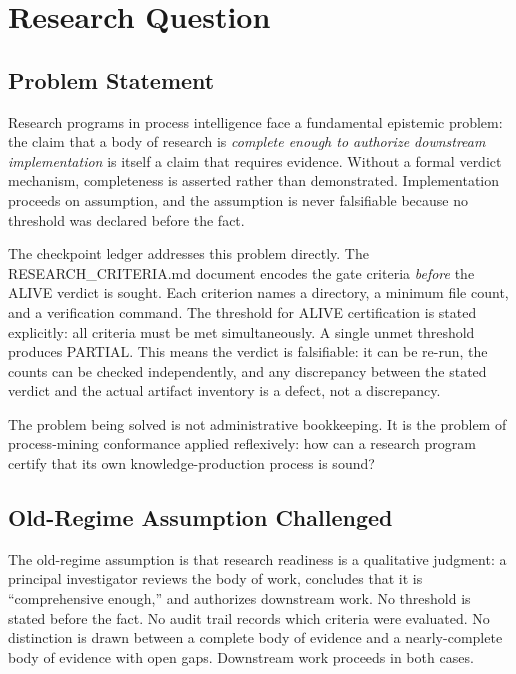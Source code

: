 \section{Research Question}
\label{sec:checkpoints-question}

\subsection{Problem Statement}
\label{sec:checkpoints-question-problem}

Research programs in process intelligence face a fundamental epistemic problem: the claim that a body
of research is \emph{complete enough to authorize downstream implementation} is itself a claim that
requires evidence. Without a formal verdict mechanism, completeness is asserted rather than
demonstrated. Implementation proceeds on assumption, and the assumption is never falsifiable because
no threshold was declared before the fact.

The checkpoint ledger addresses this problem directly. The RESEARCH\_CRITERIA.md document encodes
the gate criteria \emph{before} the ALIVE verdict is sought. Each criterion names a directory, a
minimum file count, and a verification command. The threshold for ALIVE certification is stated
explicitly: all criteria must be met simultaneously. A single unmet threshold produces PARTIAL. This
means the verdict is falsifiable: it can be re-run, the counts can be checked independently, and any
discrepancy between the stated verdict and the actual artifact inventory is a defect, not a discrepancy.

The problem being solved is not administrative bookkeeping. It is the problem of process-mining
conformance applied reflexively: how can a research program certify that its own knowledge-production
process is sound?

\subsection{Old-Regime Assumption Challenged}
\label{sec:checkpoints-question-old-regime}

The old-regime assumption is that research readiness is a qualitative judgment: a principal investigator
reviews the body of work, concludes that it is \textquotedblleft comprehensive enough,\textquotedblright{}
and authorizes downstream work. No threshold is stated before the fact. No audit trail records which
criteria were evaluated. No distinction is drawn between a complete body of evidence and a
nearly-complete body of evidence with open gaps. Downstream work proceeds in both cases.

